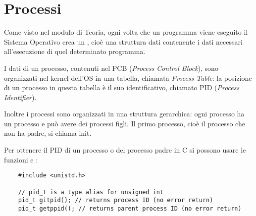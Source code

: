 \section{Processi}

Come visto nel modulo di Teoria, ogni volta che un programma viene eseguito il Sistema Operativo crea un , cioè una struttura dati contenente i dati necessari all'esecuzione di quel determinato programma. 

I dati di un processo, contenuti nel \textsf{PCB} (\emph{Process Control Block}), sono organizzati nel kernel dell'OS in una tabella, chiamata \emph{Process Table}: la posizione di un processo in questa tabella è il suo identificativo, chiamato \textsf{PID} (\emph{Process Identifier}).

Inoltre i processi sono organizzati in una struttura gerarchica: ogni processo ha un processo  e può avere dei processi figli. Il primo processo, cioè il processo che non ha padre, si chiama \textsf{init}.

Per ottenere il \textsf{PID} di un processo o del processo padre in C si possono usare le funzioni  e :

\begin{verbatim}
    #include <unistd.h>

    // pid_t is a type alias for unsigned int
    pid_t gitpid(); // returns process ID (no error return)
    pid_t getppid(); // returns parent process ID (no error return)
\end{verbatim}